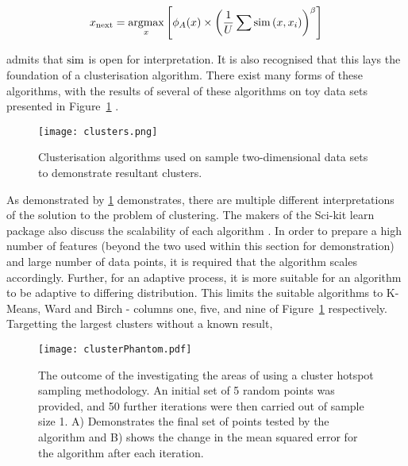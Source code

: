 \begin{equation}
  \label{eq:Settles_density}
  x_\mathrm{next}=\operatorname*{argmax}_x{\left[\phi_A(x)\times{\left(\frac{1}{U}\sum{\operatorname*{sim}{(x, x_i)}}\right)}^\beta\right]}
\end{equation}

\textcite{Set08} admits that $\operatorname*{sim}$ is open for interpretation. It is also recognised that this lays the foundation of a clusterisation algorithm. There exist many forms of these algorithms, with the results of several of these algorithms on toy data sets presented in Figure~\ref{fig:ClusterResults} \cite{SciClus}.

\begin{figure}[H]
  \begin{center}
    \texttt{[image: clusters.png]}
    \caption[]{Clusterisation algorithms used on sample two-dimensional data sets to demonstrate resultant clusters.}
    \label{fig:ClusterResults}
  \end{center}
\end{figure}

As demonstrated by \ref{fig:ClusterResults} demonstrates, there are multiple different interpretations of the solution to the problem of clustering. The makers of the Sci-kit learn package also discuss the scalability of each algorithm \cite{SciClus}. In order to prepare a high number of features (beyond the two used within this section for demonstration) and large number of data points, it is required that the algorithm scales accordingly. Further, for an adaptive process, it is more suitable for an algorithm to be adaptive to differing distribution. This limits the suitable algorithms to K-Means, Ward and Birch - columns one, five, and nine of Figure~\ref{fig:ClusterResults} respectively. Targetting the largest clusters without a known result,

\begin{figure}[H]
  \begin{center}
    \texttt{[image: clusterPhantom.pdf]}
    \caption[Cluster Hotspot Sampling Illustration]{The outcome of the investigating the areas of using a cluster hotspot sampling methodology. An initial set of 5 random points was provided, and 50 further iterations were then carried out of sample size 1. A) Demonstrates the final set of points tested by the algorithm and B) shows the change in the mean squared error for the algorithm after each iteration.}
    \label{fig:clusterPhantom}
  \end{center}
\end{figure}

